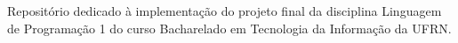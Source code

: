 Repositório dedicado à implementação do projeto final da disciplina Linguagem de Programação 1 do curso Bacharelado em Tecnologia da Informação da U\+F\+RN. 